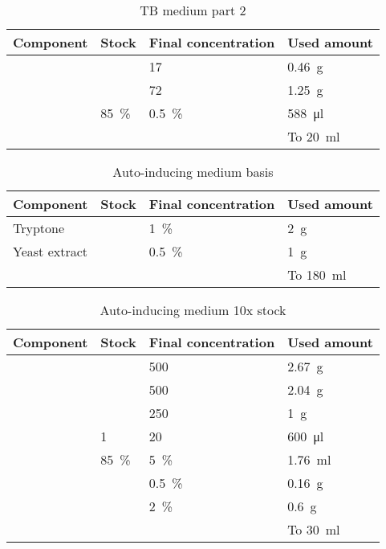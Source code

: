 \begin{table}
	\centering
	\begin{tabu}{llll}
		\toprule
		Component & Stock & Final concentration & Used amount \\
		\midrule
		 & & \SI{17}{\milli\Molar} & \SI{0.46}{\g} \\
		 & & \SI{72}{\milli\Molar} & \SI{1.25}{\g} \\
		 & \SI{85}{\percent} & \SI{0.5}{\percent} & \SI{588}{\ul} \\
		 & & & To \SI{20}{\ml} \\
		\bottomrule
	\end{tabu}
	\caption{TB medium part 2}
	\label{tbl:medium_tb_2}
\end{table}

\begin{table}
	\centering
	\begin{tabu}{llll}
		\toprule
		Component & Stock & Final concentration & Used amount \\
		\midrule
		Tryptone & & \SI{1}{\percent} & \SI{2}{\g} \\
		Yeast extract & & \SI{0.5}{\percent} & \SI{1}{\g} \\
		 & & & To \SI{180}{\ml} \\
		\bottomrule
	\end{tabu}
	\caption{Auto-inducing medium basis}
	\label{tbl:medium_auto_basis}
\end{table}

\begin{table}
	\centering
	\begin{tabu}{llll}
		\toprule
		Component & Stock & Final concentration & Used amount \\
		\midrule
		 & & \SI{500}{\milli\Molar} & \SI{2.67}{\g} \\
		 & & \SI{500}{\milli\Molar} & \SI{2.04}{\g} \\
		 & & \SI{250}{\milli\Molar} & \SI{1}{\g} \\
		 & \SI{1}{\Molar} & \SI{20}{\milli\Molar} & \SI{600}{\ul} \\
		 & \SI{85}{\percent} & \SI{5}{\percent} & \SI{1.76}{\ml} \\
		 & & \SI{0.5}{\percent} & \SI{0.16}{\g} \\
		 & & \SI{2}{\percent} & \SI{0.6}{\g} \\
		 & & & To \SI{30}{\ml} \\
		\bottomrule
	\end{tabu}
	\caption{Auto-inducing medium 10x stock}
	\label{tbl:medium_auto_stock}
\end{table}



